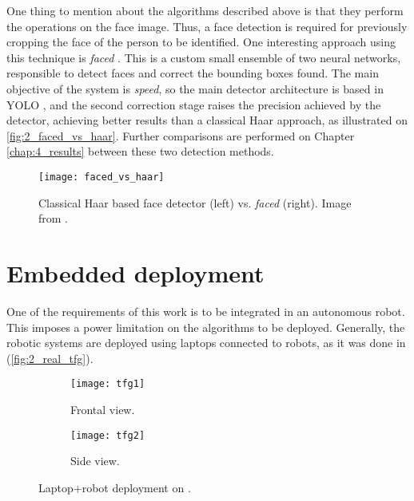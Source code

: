 One thing to mention about the algorithms described above is that they perform the operations on the face image. Thus, a face detection is required for previously cropping the face of the person to be identified. One interesting approach using this technique is \textit{faced} \cite{faced}. This is a custom small ensemble of two neural networks, responsible to detect faces and correct the bounding boxes found. The main objective of the system is \textit{speed}, so the main detector architecture is based in YOLO \cite{yolov1}, and the second correction stage raises the precision achieved by the detector, achieving better results than a classical Haar approach, as illustrated on \autoref{fig:2_faced_vs_haar}. Further comparisons are performed on Chapter \ref{chap:4_results} between these two detection methods.

\begin{figure}[h]
	\centering
	\texttt{[image: faced\_vs\_haar]}
	\caption{Classical Haar based face detector \cite{violajones} (left) vs. \textit{faced} (right). Image from \cite{faced}.}
	\label{fig:2_faced_vs_haar}
\end{figure}


\section{Embedded deployment}
\label{sec:2_embedded}
One of the requirements of this work is to be integrated in an autonomous robot. This imposes a power limitation on the algorithms to be deployed. Generally, the robotic systems are deployed using laptops connected to robots, as it was done in \cite{tfg} (\autoref{fig:2_real_tfg}).

\begin{figure}[h]
	\centering
	\begin{subfigure}[h]{0.4\linewidth}
		\texttt{[image: tfg1]}
		\caption{Frontal view.}
		\label{fig:2_turtlebot_front}
	\end{subfigure}
	\begin{subfigure}[h]{0.4\linewidth}
		\texttt{[image: tfg2]}
		\caption{Side view.}
		\label{fig:2_turtlebot_side}
	\end{subfigure}
	\caption{Laptop+robot deployment on \cite{tfg}.}
	\label{fig:2_real_tfg}
\end{figure}

